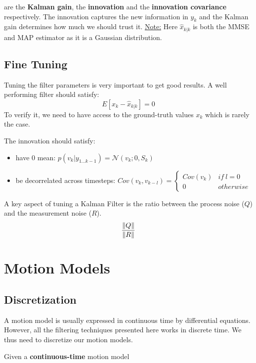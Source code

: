 are the \textbf{Kalman gain}, the \textbf{innovation} and the \textbf{innovation covariance} respectively.
The innovation captures the new information in $y_k$ and the Kalman gain determines how much we should trust it.
\underline{Note:} Here $\hat{x}_{k|k}$ is both the MMSE and MAP estimator as it is a Gaussian distribution.

\subsection{Fine Tuning}
Tuning the filter parameters is very important to get good results.
A well performing filter should satisfy:
\begin{equation}
    E[x_k - \hat{x}_{k|k}] = 0
\end{equation}
To verify it, we need to have access to the ground-truth values $x_k$ which is rarely the case.


The innovation should satisfy:
\begin{itemize}
    \item have 0 mean: $p(v_k|y_{1\dots k-1}) = \mathcal{N}(v_k; 0, S_k)$
    \item be decorrelated across timesteps: $Cov(v_k, v_{k-l}) = \left\{\begin{array}{cc}
        Cov(v_k) & if\:l=0\\
        0 & otherwise
    \end{array}\right.$
\end{itemize}

A key aspect of tuning a Kalman Filter is the ratio between the process noise ($Q$) and the measurement noise ($R$).
\begin{equation}
    \frac{\left\lVert Q\right\rVert}{\left\lVert R\right\rVert}
\end{equation}

\section{Motion Models}

\subsection{Discretization}
A motion model is usually expressed in continuous time by differential equations. However, all the filtering techniques presented here works in discrete time. We thus need to discretize our motion models.

Given a \textbf{continuous-time} motion model

